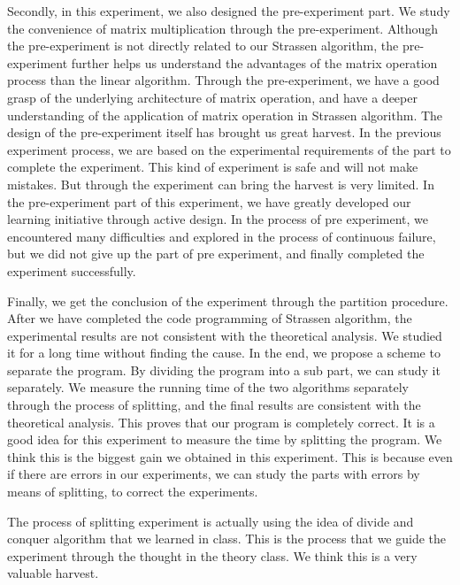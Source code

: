 \documentclass[journal]{IEEEtran}
\begin{document}
Secondly, in this experiment, we also designed the pre-experiment part.
We study the convenience of matrix multiplication through the pre-experiment. Although the pre-experiment is not directly related to our Strassen algorithm, the pre-experiment further helps us understand the advantages of the matrix operation process than the linear algorithm.
Through the pre-experiment, we have a good grasp of the underlying architecture of matrix operation, and have a deeper understanding of the application of matrix operation in Strassen algorithm.
The design of the pre-experiment itself has brought us great harvest.
In the previous experiment process, we are based on the experimental requirements of the part to complete the experiment.
This kind of experiment is safe and will not make mistakes.
But through the experiment can bring the harvest is very limited.
In the pre-experiment part of this experiment, we have greatly developed our learning initiative through active design.
In the process of pre experiment, we encountered many difficulties and explored in the process of continuous failure, but we did not give up the part of pre experiment, and finally completed the experiment successfully.


Finally, we get the conclusion of the experiment through the partition procedure.
After we have completed the code programming of Strassen algorithm, the experimental results are not consistent with the theoretical analysis.
We studied it for a long time without finding the cause.
In the end, we propose a scheme to separate the program. By dividing the program into a sub part, we can study it separately.
We measure the running time of the two algorithms separately through the process of splitting, and the final results are consistent with the theoretical analysis.
This proves that our program is completely correct.
It is a good idea for this experiment to measure the time by splitting the program.
We think this is the biggest gain we obtained in this experiment.
This is because even if there are errors in our experiments, we can study the parts with errors by means of splitting, to correct the experiments.


The process of splitting experiment is actually using the idea of divide and conquer algorithm that we learned in class.
This is the process that we guide the experiment through the thought in the theory class.
We think this is a very valuable harvest.
\end{document}
